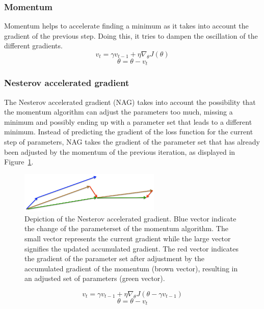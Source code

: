 \subsubsection{Momentum \label{subsubsec:momentum}}
Momentum helps to accelerate finding a minimum as it takes into account the gradient of the previous step. Doing this, it tries to dampen the oscillation of the different gradients. 
$$v_t = \gamma v_{t-1} + \eta \nabla_\theta J( \theta)$$
$$ \theta = \theta - v_t $$
\subsubsection{Nesterov accelerated gradient \label{subsubsec:nesterov}}
The Nesterov accelerated gradient (NAG) takes into account the possibility that the momentum algorithm can adjust the parameters too much, missing a minimum and possibly ending up with a parameter set that leads to a different minimum. Instead of predicting the gradient of the loss function for the current step of parameters, NAG takes the gradient of the parameter set that has already been adjusted by the momentum of the previous iteration, as displayed in Figure~\ref{fig:nag}.

\begin{figure}[h!]
	\centering
	\includegraphics[width=0.6\textwidth]{../figures/nag}
	\caption{Depiction of the Nesterov accelerated gradient. Blue vector indicate the change of the parameterset of the momentum algorithm. The small vector represents the current gradient while the large vector signifies the updated accumulated gradient. The red vector indicates the gradient of the parameter set after adjustment by the accumulated gradient of the momentum (brown vector), resulting in an adjusted set of parameters (green vector).
		\label{fig:nag}}
\end{figure}

$$v_t = \gamma v_{t-1} + \eta \nabla_\theta J( \theta - \gamma v_{t-1})$$
$$ \theta = \theta - v_t $$

